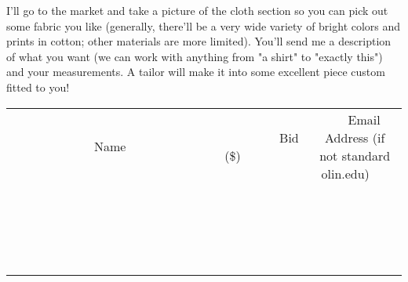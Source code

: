 \documentclass[11pt]{article}
\begin{document}
I'll go to the market and take a picture of the cloth section so you can pick out some fabric you like (generally, there'll be a very wide variety of bright colors and prints in cotton; other materials are more limited). You'll send me a description of what you want (we can work with anything from "a shirt" to "exactly this") and your measurements. A tailor will make it into some excellent piece custom fitted to you!
\\[3ex]
\begin{tabular}{c c c}
~~~~~~~~~~~~~Name~~~~~~~~~~~~~ & ~~~~~~~~~Bid (\$)~~~~~~~~~  & ~~~Email Address (if not standard olin.edu)~~~\\
 & & \\
\hline
 & & \\
\hline
 & & \\
\hline
 & & \\
\hline
 & & \\
\hline
 & & \\
\hline
 & & \\
\hline
 & & \\
\hline
 & & \\
\hline
 & & \\
\hline
 & & \\
\hline
 & & \\
\hline
 & & \\
\hline
 & & \\
\hline
 & & \\
\hline
 & & \\
\hline
 & & \\
\hline
 & & \\
\hline
 & & \\
\hline
\end{tabular}
\newpage
\end{document}
